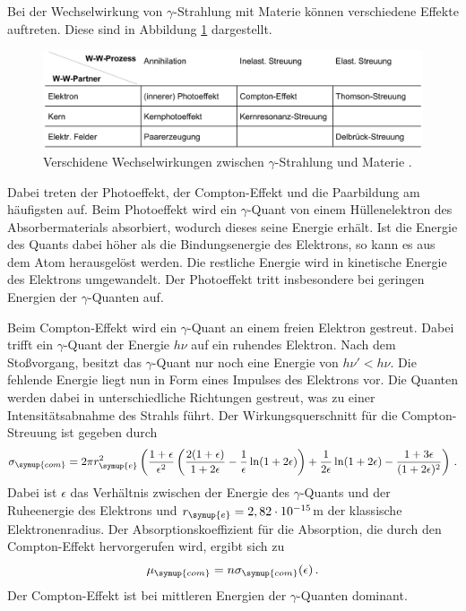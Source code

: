 Bei der Wechselwirkung von $\gamma$-Strahlung mit Materie können verschiedene
Effekte auftreten. Diese sind in Abbildung \ref{fig:wechselwirkung} dargestellt.

\begin{figure}
  \centering
  \includegraphics[width=\textwidth]{data/wechselwirkung.png}
  \caption{Verschidene Wechselwirkungen zwischen $\gamma$-Strahlung und Materie \cite{Versuchsanleitung}.}
  \label{fig:wechselwirkung}
\end{figure}

Dabei treten der Photoeffekt, der Compton-Effekt und die Paarbildung am häufigsten auf.
Beim Photoeffekt wird ein $\gamma$-Quant von einem Hüllenelektron des Absorbermaterials
absorbiert, wodurch dieses seine Energie erhält. Ist die Energie des Quants dabei höher als die
Bindungsenergie des Elektrons, so kann es aus dem Atom herausgelöst werden. Die
restliche Energie wird in kinetische Energie des Elektrons umgewandelt. Der Photoeffekt
tritt insbesondere bei geringen Energien der $\gamma$-Quanten auf.

Beim Compton-Effekt wird ein $\gamma$-Quant an einem freien Elektron gestreut.
Dabei trifft ein $\gamma$-Quant der Energie $h \nu$ auf ein ruhendes Elektron.
Nach dem Stoßvorgang, besitzt das $\gamma$-Quant nur noch eine Energie von $h \nu' < h \nu$.
Die fehlende Energie liegt nun in Form eines Impulses des Elektrons vor. Die Quanten
werden dabei in unterschiedliche Richtungen gestreut, was zu einer Intensitätsabnahme
des Strahls führt. Der Wirkungsquerschnitt für die Compton-Streuung ist gegeben
durch
\begin{equation}
  \sigma_{\symup{com}}= 2 \pi r_{\symup{e}}^2 \left(\frac{1+\epsilon}{\epsilon^2}
  \left(\frac{2(1+\epsilon)}{1+2\epsilon}-\frac{1}{\epsilon}\ln(1+2\epsilon)\right)
  +\frac{1}{2\epsilon}\ln(1+2\epsilon)-\frac{1+3\epsilon}{(1+2\epsilon)^2}\right) \,.
  \label{eqn:sigma_compton}
\end{equation}
Dabei ist $\epsilon$ das Verhältnis zwischen der Energie des $\gamma$-Quants und
der Ruheenergie des Elektrons und $r_{\symup{e}} = 2,82 \cdot 10^{-15}$m %
der klassische Elektronenradius. Der Absorptionskoeffizient für die Absorption, die
durch den Compton-Effekt hervorgerufen wird, ergibt sich zu
\begin{equation}
  \mu_{\symup{com}}=n \sigma_{\symup{com}}(\epsilon) \,.
  \label{eqn:mucompton}
\end{equation}
Der Compton-Effekt ist bei mittleren Energien der $\gamma$-Quanten dominant.

